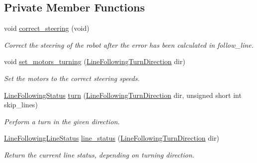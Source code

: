 \subsection*{Private Member Functions}
\begin{DoxyCompactItemize}
\item 
void \hyperlink{classIDP_1_1LineFollowing_a91695c96ef09bd407b9b57dd7f6fcdfa}{correct\_\-steering} (void)
\begin{DoxyCompactList}\small\item\em Correct the steering of the robot after the error has been calculated in follow\_\-line. \item\end{DoxyCompactList}\item 
void \hyperlink{classIDP_1_1LineFollowing_a5eeec6030c425b39a8571dcb55454465}{set\_\-motors\_\-turning} (\hyperlink{namespaceIDP_aba52d8ae6ecf9eb4c7edb518bcc02544}{LineFollowingTurnDirection} dir)
\begin{DoxyCompactList}\small\item\em Set the motors to the correct steering speeds. \item\end{DoxyCompactList}\item 
\hyperlink{namespaceIDP_a5993bdfdd901fc5521c8df42dca43bd0}{LineFollowingStatus} \hyperlink{classIDP_1_1LineFollowing_a64b6d9188e8382c1f73d0cb06b54174c}{turn} (\hyperlink{namespaceIDP_aba52d8ae6ecf9eb4c7edb518bcc02544}{LineFollowingTurnDirection} dir, unsigned short int skip\_\-lines)
\begin{DoxyCompactList}\small\item\em Perform a turn in the given direction. \item\end{DoxyCompactList}\item 
\hyperlink{namespaceIDP_ac3688e4c6bc9b671b09672d71ebccc40}{LineFollowingLineStatus} \hyperlink{classIDP_1_1LineFollowing_a4acd259fcdb1b2e2885fec9716eb0b93}{line\_\-status} (\hyperlink{namespaceIDP_aba52d8ae6ecf9eb4c7edb518bcc02544}{LineFollowingTurnDirection} dir)
\begin{DoxyCompactList}\small\item\em Return the current line status, depending on turning direction. \item\end{DoxyCompactList}\end{DoxyCompactItemize}
